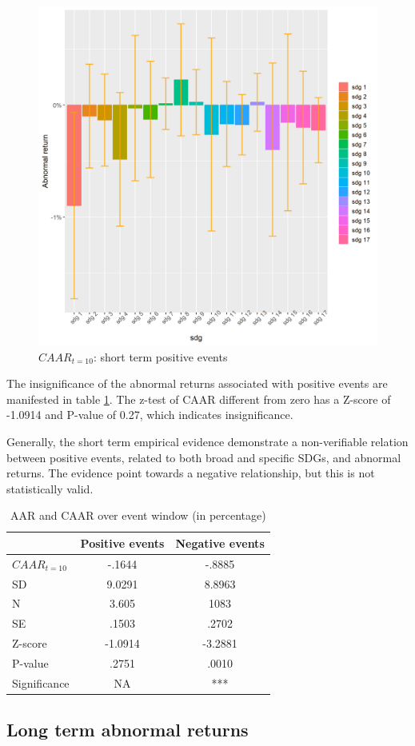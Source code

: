 \begin{figure} [H]
    \centering
    \includegraphics[scale=0.6]{Projekt/1.Figures analysis/ST_positive_sdg_bar.png}
    \caption{$CAAR_{t=10}$: short term positive events}
    \label{fig:ST_pos_bar}
\end{figure}



The insignificance of the abnormal returns associated with positive events are manifested in table \ref{tab: ST_significace}. The z-test of CAAR different from zero has a Z-score of -1.0914 and P-value of 0.27, which indicates insignificance. 

Generally, the short term empirical evidence demonstrate a non-verifiable relation between positive events, related to both broad and specific SDGs, and abnormal returns. The evidence point towards a negative relationship, but this is not statistically valid. 

\begin{table}[ht]
\centering
\begin{tabular}{lcc}
   \hline \hline
  & Positive events & Negative events  \\
 \hline
$CAAR_{t=10}$ & -.1644   & -.8885  \\ 
SD & 9.0291 & 8.8963 \\ 
N & 3.605 & 1083 \\
 SE & .1503 & .2702  \\ 
 Z-score  & -1.0914 & -3.2881 \\ 
 P-value  & .2751 & .0010  \\ 
 Significance & NA & *** \\ 
   \hline
\end{tabular}
\caption{AAR and CAAR over event window (in percentage)} 
\label{tab: ST_significace}
\end{table}



\subsection{Long term abnormal returns}


